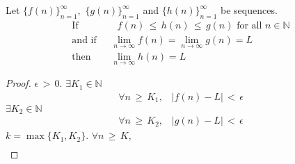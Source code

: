 \begin{theorem}
Let $\{f(n)\}_{n=1}^{\infty}, \hspace{4pt} \{g(n)\}_{n=1}^{\infty}$ and $\{h(n)\}_{n=1}^{\infty}$ be sequences.
\begin{align*}
    \text{If} &\hspace{8pt} f(n) \hspace{2pt} \leq \hspace{2pt} h(n) \hspace{2pt} \leq \hspace{2pt} g(n) \hspace{4pt} \text{for all} \hspace{4pt} n \in \mathbb{N} \\[1ex]
    \text{and if} \hspace{8pt} &\lim_{n \longrightarrow \infty} f(n) = \lim_{n \longrightarrow \infty} g(n) = L \\[1ex]
    \text{then} \hspace{8pt} &\lim_{n \longrightarrow \infty} h(n) = L 
\end{align*}
\label{squeeze_theorem}
\begin{proof}
     $\epsilon \hspace{2pt} > \hspace{2pt} 0.$  $\exists K_{1} \in \mathbb{N}$ 
    \begin{align*}
        \forall n \hspace{2pt} \geq \hspace{2pt} K_{1}, \hspace{10pt} \lvert f(n) - L \rvert \hspace{2pt} < \hspace{2pt} \epsilon
    \end{align*}
     $\exists K_{2} \in \mathbb{N}$ 
    \begin{align*}
        \forall n \hspace{2pt} \geq \hspace{2pt} K_{2}, \hspace{10pt} \lvert g(n) - L \rvert \hspace{2pt} < \hspace{2pt} \epsilon 
    \end{align*}
     $k = \max\{K_{1}, K_{2}\}.$  $\forall n \hspace{2pt} \geq \hspace{2pt} K,$ 
    \begin{align*}

\end{align*}
\end{proof}
\end{theorem}
